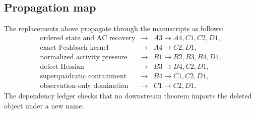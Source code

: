 \subsection{Propagation map}

The replacements above propagate through the manuscripts as follows:
\[
 \begin{array}{ccl}
 \text{ordered state and AC recovery}&\longrightarrow&A3\longrightarrow A4,C1,C2,D1,\\
 \text{exact Feshbach kernel}&\longrightarrow&A4\longrightarrow C2,D1,\\
 \text{normalized activity pressure}&\longrightarrow&B1\longrightarrow B2,B3,B4,D1,\\
 \text{defect Hessian}&\longrightarrow&B3\longrightarrow B4,C2,D1,\\
 \text{superquadratic containment}&\longrightarrow&B4\longrightarrow C1,C2,D1,\\
 \text{observation-only domination}&\longrightarrow&C1\longrightarrow C2,D1.
 \end{array}
\]
The dependency ledger checks that no downstream theorem imports the deleted
object under a new name.
